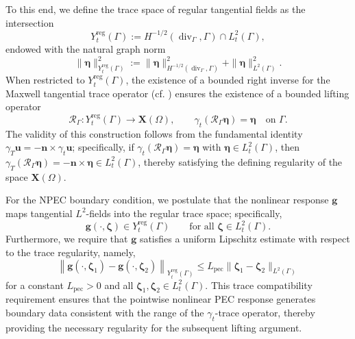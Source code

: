 \documentclass[12pt,reqno]{amsart}
\theoremstyle{definition}
\numberwithin{equation}{section}
\begin{document}
To this end, we define the trace space of regular tangential fields as the intersection
\[
Y_t^{\mathrm{reg}}(\Gamma) := H^{-1/2}(\operatorname{div}_\Gamma, \Gamma) \cap L_t^2(\Gamma),
\]
endowed with the natural graph norm
\[
\|\boldsymbol{\eta}\|_{Y_t^{\mathrm{reg}}(\Gamma)}^2 := \|\boldsymbol{\eta}\|_{H^{-1/2}(\operatorname{div}_\Gamma, \Gamma)}^2 + \|\boldsymbol{\eta}\|_{L^2(\Gamma)}^2.
\]
When restricted to $Y_t^{\mathrm{reg}}(\Gamma)$, the existence of a bounded right inverse for the Maxwell tangential trace operator (cf. \cite{BuffaCostabelSheen2002, Monk2003}) ensures the existence of a bounded lifting operator
\[
\mathcal{R}_\Gamma \colon Y_t^{\mathrm{reg}}(\Gamma) \to \mathbf{X}(\Omega), \qquad \gamma_t(\mathcal{R}_\Gamma \boldsymbol{\eta}) = \boldsymbol{\eta} \quad \text{on } \Gamma.
\]
The validity of this construction follows from the fundamental identity $\gamma_T \mathbf{u} = -\mathbf{n} \times \gamma_t \mathbf{u}$; specifically, if $\gamma_t(\mathcal{R}_\Gamma \boldsymbol{\eta}) = \boldsymbol{\eta}$ with $\boldsymbol{\eta} \in L_t^2(\Gamma)$, then $\gamma_T(\mathcal{R}_\Gamma \boldsymbol{\eta}) = -\mathbf{n} \times \boldsymbol{\eta} \in L_t^2(\Gamma)$, thereby satisfying the defining regularity of the space $\mathbf{X}(\Omega)$.

For the NPEC boundary condition, we postulate that the nonlinear response $\mathbf{g}$ maps tangential $L^2$-fields into the regular trace space; specifically, 
\[
\mathbf{g}(\cdot, \boldsymbol{\zeta}) \in Y_t^{\mathrm{reg}}(\Gamma) \qquad \text{for all } \boldsymbol{\zeta} \in L_t^2(\Gamma).
\]
Furthermore, we require that $\mathbf{g}$ satisfies a uniform Lipschitz estimate with respect to the trace regularity, namely,
\begin{equation}\label{eq:NPEC_lipschitz_trace}
\left\| \mathbf{g}(\cdot, \boldsymbol{\zeta}_1) - \mathbf{g}(\cdot, \boldsymbol{\zeta}_2) \right\|_{Y_t^{\mathrm{reg}}(\Gamma)} \le L_{\mathrm{pec}} \|\boldsymbol{\zeta}_1 - \boldsymbol{\zeta}_2\|_{L^2(\Gamma)}
\end{equation}
for a constant $L_{\mathrm{pec}} > 0$ and all $\boldsymbol{\zeta}_1, \boldsymbol{\zeta}_2 \in L_t^2(\Gamma)$. This trace compatibility requirement ensures that the pointwise nonlinear PEC response generates boundary data consistent with the range of the $\gamma_t$-trace operator, thereby providing the necessary regularity for the subsequent lifting argument.
\end{document}
